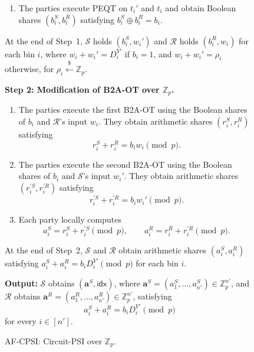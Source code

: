 \documentclass[sigconf,anonymous,review]{acmart}
\begin{document}
\begin{figure}[h]
{\begin{minipage}{0.95\linewidth}
\begin{enumerate}
        \item
        The parties execute PEQT on $t_i'$ and $t_i$ and obtain
        Boolean shares $(b_i^S,b_i^R)$ satisfying
        $
            b_i^S\oplus b_i^R=b_i.
        $

    \end{enumerate}

    At the end of Step~1, $\mathcal{S}$ holds $(b_i^S,w_i')$ and
    $\mathcal{R}$ holds $(b_i^R,w_i)$ for each bin $i$, where
    $w_i+w_i'=D_i^{Y'}$ if $b_i=1$, and
    $w_i+w_i'=\rho_i$ otherwise, for
    $\rho_i\xleftarrow{\$}\mathbb{Z}_p$.

    \medskip

    \textbf{Step 2: Modification of B2A-OT over $\mathbb{Z}_p$.}

    \begin{enumerate}

        \item
        The parties execute the first B2A-OT using the Boolean
        shares of $b_i$ and $\mathcal{R}$'s input $w_i$.
        They obtain arithmetic shares $(r_i^S,r_i^R)$ satisfying
        \[
            r_i^S+r_i^R=b_iw_i\pmod p.
        \]

        \item
        The parties execute the second B2A-OT using the Boolean
        shares of $b_i$ and $\mathcal{S}$'s input $w_i'$.
        They obtain arithmetic shares
        $(r_i^{\prime S},r_i^{\prime R})$ satisfying
        \[
            r_i^{\prime S}+r_i^{\prime R}
            =b_iw_i'\pmod p.
        \]

        \item
        Each party locally computes
        \[
            a_i^S=r_i^S+r_i^{\prime S}\pmod p,
            \qquad
            a_i^R=r_i^R+r_i^{\prime R}\pmod p.
        \]

    \end{enumerate}

    At the end of Step~2, $\mathcal{S}$ and $\mathcal{R}$ obtain
    arithmetic shares $(a_i^S,a_i^R)$ satisfying
    $a_i^S+a_i^R=b_iD_i^{Y'}\pmod p$ for each bin $i$.


    \textbf{Output:}
    $\mathcal{S}$ obtains
    $(\mathbf{a}^S,\mathsf{idx})$, where
    $\mathbf{a}^S=(a_1^S,\ldots,a_{n'}^S)\in\mathbb{Z}_p^{n'}$,
    and $\mathcal{R}$ obtains
    $\mathbf{a}^R=(a_1^R,\ldots,a_{n'}^R)\in\mathbb{Z}_p^{n'}$,
    satisfying
    \[
        a_i^S+a_i^R=b_iD_i^{Y'}\pmod p
    \]
    for every $i\in[n']$.

    \end{minipage}%
    }
    \caption{AF-CPSI: Circuit-PSI over $\mathbb{Z}_p$.}
    \label{fig:cpsi-zp-construction}
\end{figure}
\end{document}
